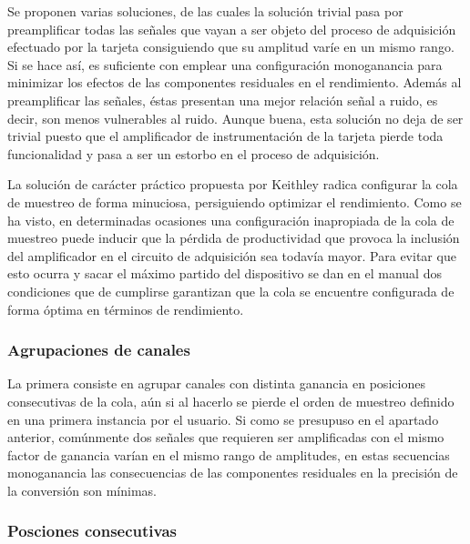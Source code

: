 Se proponen varias soluciones, de las cuales la solución trivial pasa por
preamplificar todas las señales que vayan a ser objeto del proceso de
adquisición efectuado por la tarjeta consiguiendo que su amplitud varíe en
un mismo rango. Si se hace así, es suficiente con emplear una configuración
monoganancia para minimizar los efectos de las componentes residuales en el
rendimiento. Además al preamplificar las señales, éstas presentan una mejor
relación señal a ruido, es decir, son menos vulnerables al ruido. Aunque
buena, esta solución no deja de ser trivial puesto que el amplificador de
instrumentación de la tarjeta pierde toda funcionalidad y pasa a ser un
estorbo en el proceso de adquisición.

La solución de carácter práctico propuesta por Keithley radica configurar
la cola de muestreo de forma minuciosa, persiguiendo optimizar el
rendimiento. Como se ha visto, en determinadas ocasiones una configuración
inapropiada de la cola de muestreo puede inducir que la pérdida de
productividad que provoca la inclusión del amplificador en el circuito de
adquisición sea todavía mayor. Para evitar que esto ocurra y sacar el
máximo partido del dispositivo se dan en el manual dos condiciones que de
cumplirse garantizan que la cola se encuentre configurada de forma óptima
en términos de rendimiento.


\subsubsection{Agrupaciones de canales}

La primera consiste en agrupar canales con distinta ganancia en posiciones
consecutivas de la cola, aún si al hacerlo se pierde el orden de muestreo
definido en una primera instancia por el usuario. Si como se presupuso en
el apartado anterior, comúnmente dos señales que requieren ser amplificadas
con el mismo factor de ganancia varían en el mismo rango de amplitudes, en
estas secuencias monoganancia las consecuencias de las componentes
residuales en la precisión de la conversión son mínimas.


\subsubsection{Posciones consecutivas}

